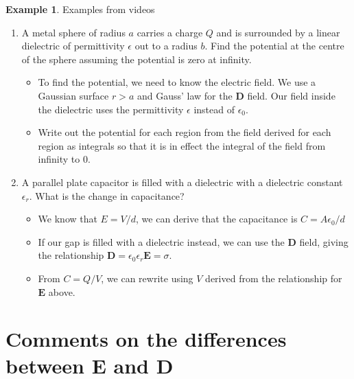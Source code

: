 \documentclass[12pt,chapterprefix=false,dvipsnames]{scrbook}
\theoremstyle{dotless}
\theoremstyle{definition}
\newtheorem{protoexample}{Example}[section]
\newenvironment{example}
{\colorlet{shadecolor}{red!15}\begin{shaded}\begin{protoexample}}
			{\end{protoexample}\end{shaded}}
\begin{document}
\begin{example}
	Examples from videos
	\begin{enumerate}
		\item A metal sphere of radius $a$ carries a
		      charge $Q$ and is surrounded by a linear
		      dielectric of permittivity $\epsilon$ out to a
		      radius $b$. Find the potential at the centre
		      of the sphere assuming the potential is zero at infinity.
		      \begin{itemize}
			      \item To find the potential, we need to know the electric field. We
			            use a Gaussian surface $r > a$ and Gauss' law for
			            the $\bm{D}$ field. Our field inside the
			            dielectric uses the permittivity $\epsilon$ instead
			            of $\epsilon_{0}$.
			      \item Write out the potential for each region from the field derived
			            for each region as integrals so that it is in effect the
			            integral of the field from infinity to 0.
		      \end{itemize}
		\item A parallel plate capacitor is filled with a dielectric with a
		      dielectric constant $\epsilon_{r}$. What is the change
		      in capacitance?

		      \begin{itemize}
			      \item We know that $E = V/d$, we can derive that the
			            capacitance is $C = A\epsilon_{0}/d$
			      \item If our gap is filled with a dielectric instead, we can use the
			            $\bm{D}$ field, giving the relationship
			            $\bm{D} =
				            \epsilon_{0}\epsilon_{r}
				            \bm{E} = \sigma$.
			      \item From $C = Q/V$, we can rewrite using
			            $V$ derived from the relationship for
			            $\bm{E}$ above.
		      \end{itemize}
	\end{enumerate}
\end{example}

\section{Comments on the differences between E and D}%
\label{sec:comments_on_the_differences_between_e_and_d}
\end{document}

